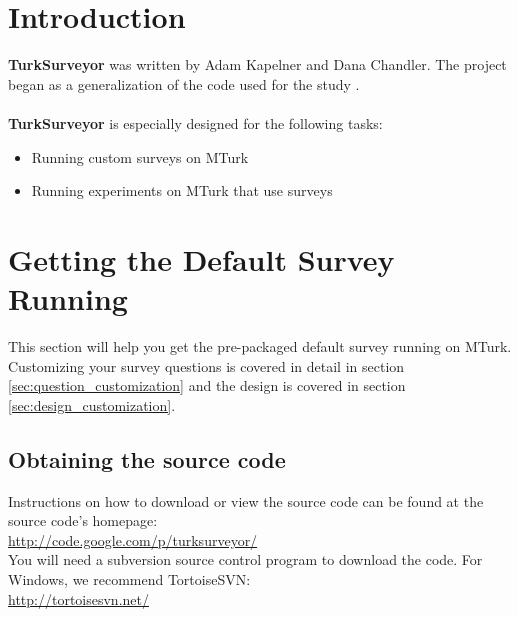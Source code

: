 \documentclass[12pt]{article}
\author{Adam Kapelner}
\begin{document}
\maketitle

\tableofcontents
\pagebreak

\section{Introduction}\label{sec:introduction}

\textbf{TurkSurveyor} was written by Adam Kapelner and Dana Chandler. The project began as a generalization of the code used for the study \citet{KapelnerChandler2010}.\\
\\
\textbf{TurkSurveyor} is especially designed for the following tasks:

\begin{itemize}
\item Running custom surveys on MTurk
\item Running experiments on MTurk that use surveys
\end{itemize}

\section{Getting the Default Survey Running}

This section will help you get the pre-packaged default survey running on MTurk. Customizing your survey questions is covered in detail in section \ref{sec:question_customization} and the design is covered in section \ref{sec:design_customization}.

\subsection{Obtaining the source code}

Instructions on how to download or view the source code can be found at the source code's homepage:\\

\href{http://code.google.com/p/turksurveyor/}{http://code.google.com/p/turksurveyor/}\\

You will need a subversion source control program to download the code. For Windows, we recommend TortoiseSVN:\\

\href{http://tortoisesvn.net/}{http://tortoisesvn.net/}\\
\end{document}

